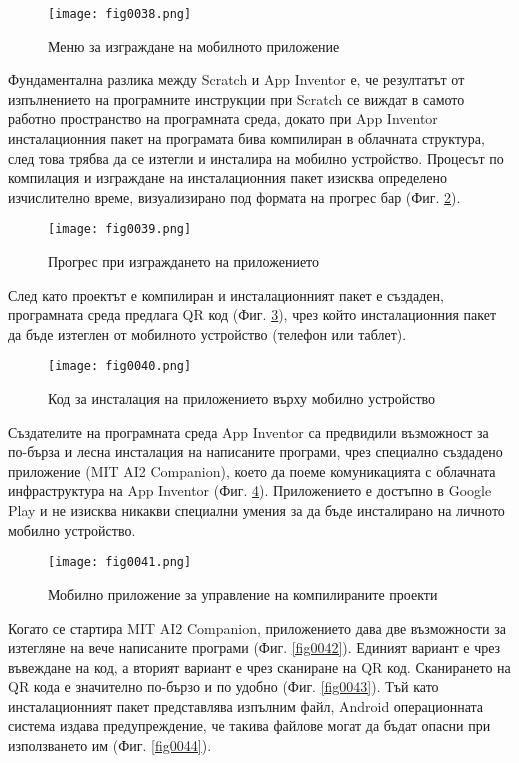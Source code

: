 \begin{figure}[H]
  \centering
  \texttt{[image: fig0038.png]}
  \caption{Меню за изграждане на мобилното приложение}
\label{fig0038}
\end{figure}

Фундаментална разлика между Scratch и App Inventor е, че резултатът от изпълнението на програмните инструкции при Scratch се виждат в самото работно пространство на програмната среда, докато при App Inventor инсталационния пакет на програмата бива компилиран в облачната структура, след това трябва да се изтегли и инсталира на мобилно устройство. Процесът по компилация и изграждане на инсталационния пакет изисква определено изчислително време, визуализирано под формата на прогрес бар (Фиг. \ref{fig0039}).

\begin{figure}[H]
  \centering
  \texttt{[image: fig0039.png]}
  \caption{Прогрес при изграждането на приложението}
\label{fig0039}
\end{figure}

След като проектът е компилиран и инсталационният пакет е създаден, програмната среда предлага QR код (Фиг. \ref{fig0040}), чрез който инсталационния пакет да бъде изтеглен от мобилното устройство (телефон или таблет).

\begin{figure}[H]
  \centering
  \texttt{[image: fig0040.png]}
  \caption{Код за инсталация на приложението върху мобилно устройство}
\label{fig0040}
\end{figure}

Създателите на програмната среда App Inventor са предвидили възможност за по-бърза и лесна инсталация на написаните програми, чрез специално създадено приложение (MIT AI2 Companion), което да поеме комуникацията с облачната инфраструктура на App Inventor (Фиг. \ref{fig0041}). Приложението е достъпно в Google Play и не изисква никакви специални умения за да бъде инсталирано на личното мобилно устройство. 

\begin{figure}[H]
  \centering
  \texttt{[image: fig0041.png]}
  \caption{Мобилно приложение за управление на компилираните проекти}
\label{fig0041}
\end{figure}

Когато се стартира MIT AI2 Companion, приложението дава две възможности за изтегляне на вече написаните програми (Фиг. \ref{fig0042}). Единият вариант е чрез въвеждане на код, а вторият вариант е чрез сканиране на QR код. Сканирането на QR кода е значително по-бързо и по удобно (Фиг. \ref{fig0043}). Тъй като инсталационният пакет представлява изпълним файл, Android операционната система издава предупреждение, че такива файлове могат да бъдат опасни при използването им (Фиг. \ref{fig0044}).

